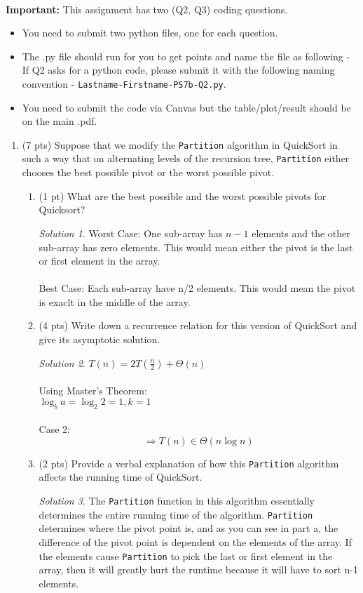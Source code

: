 \documentclass[12pt]{article}
\theoremstyle{remark}
\newtheorem*{solution}{Solution}
\begin{document}
\hrulefill
\pagebreak
\\
\textbf{Important:} This assignment has two (Q2, Q3) coding questions. 
\begin{itemize}
    \item You need to submit two python files, one for each question.
    \item The .py file should run for you to get points and name the file as following - \\
If Q2 asks for a python code, please submit it with the following naming convention - \texttt{Lastname-Firstname-PS7b-Q2.py}.
\item You need to submit the code via Canvas but the table/plot/result should be on the main .pdf.
\end{itemize}
\pagebreak

\begin{enumerate}
\item (7 pts) Suppose that we modify the {\tt Partition} algorithm in QuickSort in such a way that on alternating levels of the recursion tree, {\tt Partition} either chooses the best possible pivot or the worst possible pivot. 
\begin{enumerate}
    \item (1 pt) What are the best possible and the worst possible pivots for Quicksort?
\begin{solution}
Worst Case: One sub-array has $n-1$ elements and the other sub-array has zero elements. This would mean either the pivot is the last or first element in the array. \\ \\ 
Best Case: Each sub-array have n/2 elements. This would mean the pivot is exaclt in the middle of the array.
\end{solution}

    \item (4 pts) Write down a recurrence relation for this version of QuickSort and give its asymptotic solution. 
\begin{solution}
$T(n) = 2T(\frac{n}{2}) + \Theta(n)$ \\ \\
Using Master's Theorem: \\
$\log_b a = \log_2 2 = 1, k = 1$ \\ \\
Case 2:
$$\Rightarrow T(n) \in \Theta(n\log n)$$
\end{solution}
    \item (2 pts) Provide a verbal explanation of how this {\tt Partition} algorithm affects the running time of QuickSort.
\begin{solution}
The {\tt Partition} function in this algorithm essentially determines the entire running time of the algorithm. {\tt Partition} determines where the pivot point is, and as you can see in part a, the difference of the pivot point is dependent on the elements of the array. If the elements cause {\tt Partition} to pick the last or first element in the array, then it will greatly hurt the runtime because it will have to sort n-1 elements.
\end{solution}


\end{enumerate}
\end{enumerate}
\end{document}
